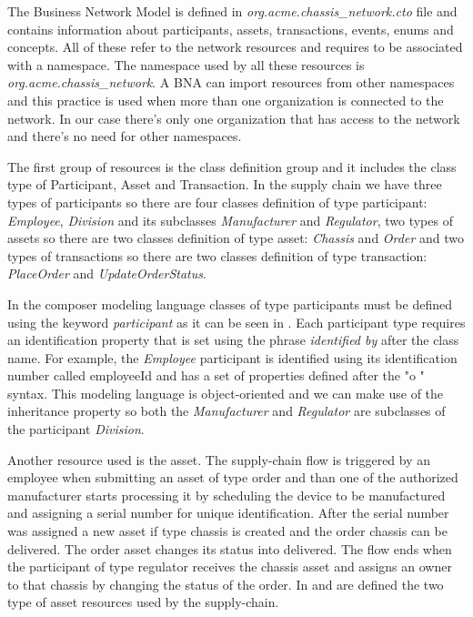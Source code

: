 
The Business Network Model is defined in \emph{org.acme.chassis_network.cto} file and contains information about participants, assets, transactions, events, enums and concepts. All of these refer to the network resources and requires to be associated with a namespace. The namespace used by all these resources is \emph{org.acme.chassis_network}. A BNA can import resources from other namespaces and this practice is used when more than one organization is connected to the network. In our case there's only one organization that has access to the network and there's no need for other namespaces.

The first group of resources is the class definition group and it includes the class type of Participant, Asset and Transaction. In the supply chain we have three types of participants so there are four classes definition of type participant: \emph{Employee}, \emph{Division} and its subclasses \emph{Manufacturer} and \emph{Regulator}, two types of assets so there are two classes definition of type asset: \emph{Chassis} and \emph{Order} and two types of transactions so there are two classes definition of type transaction: \emph{PlaceOrder} and \emph{UpdateOrderStatus}. 

In the composer modeling language classes of type participants must be defined using the keyword \emph{participant} as it can be seen in . Each participant type requires an identification property that is set using the phrase \emph{identified by} after the class name. For example, the \emph{Employee} participant is identified using its identification number called employeeId and has a set of properties defined after the "o " syntax. This modeling language is object-oriented and we can make use of the inheritance property so both the \emph{Manufacturer} and \emph{Regulator} are subclasses of the participant \emph{Division}.


Another resource used is the asset. The supply-chain flow is triggered by an employee when submitting an asset of type order and than one of the authorized manufacturer starts processing it by scheduling the device to be manufactured and assigning a serial number for unique identification. After the serial number was assigned a new asset if type chassis is created and the order chassis can be delivered. The order asset changes its status into delivered.
The flow ends when the participant of type regulator receives the chassis asset and assigns an owner to that chassis by changing the status of the order. 
In  and  are defined the two type of asset resources used by the supply-chain.

